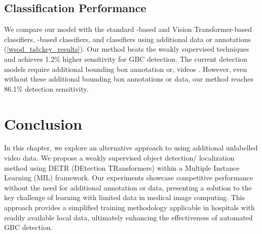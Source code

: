 \subsection{Classification Performance}
%
We compare our model with the standard \cnn-based and Vision Transformer-based classifiers, \sota \wsod-based classifiers, and \sota classifiers using additional data or annotations (\cref{wsod_tab:key_results}). Our method beats the \sota weakly supervised techniques and achieves 1.2\% higher sensitivity for GBC detection. The current \sota \gbc detection models require additional bounding box annotation \cite{basu2022surpassing} or, \usg videos \cite{basu2022unsupervised,uscl}. However, even without these additional bounding box annotations or data, our method reaches 86.1\% detection sensitivity. 

%
%
\section{Conclusion}
%

%
In this chapter, we explore an alternative approach to using additional unlabelled video data. We propose a weakly supervised object detection/ localization method using DETR (DEtection TRansformers) within a Multiple Instance Learning (MIL) framework. Our experiments showcase competitive performance without the need for additional annotation or data, presenting a solution to the key challenge of learning with limited data in medical image computing. This approach provides a simplified training methodology applicable in hospitals with readily available local data, ultimately enhancing the effectiveness of automated GBC detection. 


